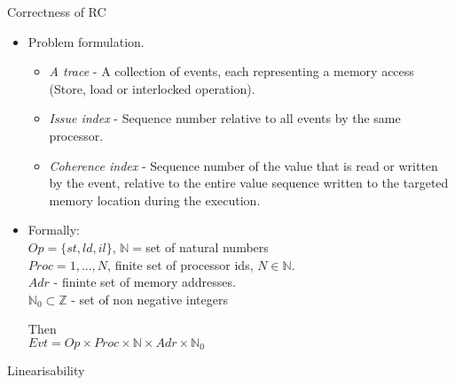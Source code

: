 \documentclass[9pt]{beamer}
\begin{document}
\begin{frame}{Correctness of RC~}
\begin{itemize}
\item Problem formulation.
	\begin{itemize}
	\item {\em A trace} - A collection of events, each representing a memory access
	      (Store, load or interlocked operation).
	\item {\em Issue index} - Sequence number relative to all events by the same processor.
	\item {\em Coherence index} - Sequence number of the value that is read or written
        by the event, relative to the entire value sequence written to the targeted memory 
			  location during the execution.	
	\end{itemize}
\item Formally: \\
\hspace{2cm}$Op = \{st, ld, il\}$, $\mathbb{N} = $set of natural numbers\\
\hspace{2cm}$Proc = {1,...,N}$, finite set of processor ids, $N \in \mathbb{N}$.\\
\hspace{2cm}$Adr$ - fininte set of memory addresses.\\
\hspace{2cm}$\mathbb{N}_0 \subset \mathbb{Z}$ - set of non negative integers

Then\\
\hspace{2cm}$Evt = Op \times Proc \times \mathbb{N} \times Adr \times \mathbb{N}_0$


              
\end{itemize}
\end{frame}

\begin{frame}{Linearisability}
\end{frame}

\footnotesize{


}
\end{document}
